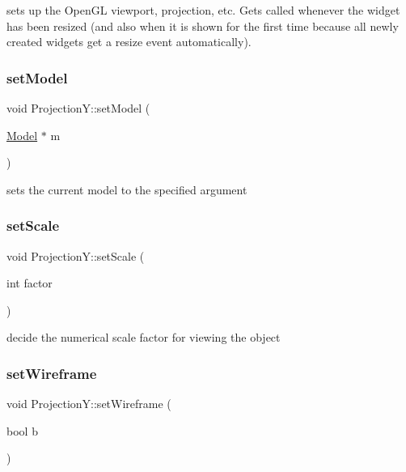 sets up the Open\+GL viewport, projection, etc. Gets called whenever the widget has been resized (and also when it is shown for the first time because all newly created widgets get a resize event automatically). 

\mbox{\label{class_projection_y_a66e7b460c9bb0c02b649a241d3b9a647}} 
\subsubsection{\texorpdfstring{set\+Model}{setModel}}
{\footnotesize\ttfamily void Projection\+Y\+::set\+Model (\begin{DoxyParamCaption}\item[{\mbox{\hyperlink{class_model}{Model}} $\ast$}]{m }\end{DoxyParamCaption})\hspace{0.3cm}{\ttfamily [slot]}}



sets the current model to the specified argument 

\mbox{\label{class_projection_y_a19960a2d4075443ab87fd50147fee276}} 
\subsubsection{\texorpdfstring{set\+Scale}{setScale}}
{\footnotesize\ttfamily void Projection\+Y\+::set\+Scale (\begin{DoxyParamCaption}\item[{int}]{factor }\end{DoxyParamCaption})\hspace{0.3cm}{\ttfamily [slot]}}



decide the numerical scale factor for viewing the object 

\mbox{\label{class_projection_y_ab59d0f6245e889c25faf1d0592145d6c}} 
\subsubsection{\texorpdfstring{set\+Wireframe}{setWireframe}}
{\footnotesize\ttfamily void Projection\+Y\+::set\+Wireframe (\begin{DoxyParamCaption}\item[{bool}]{b }\end{DoxyParamCaption})\hspace{0.3cm}{\ttfamily [slot]}}



